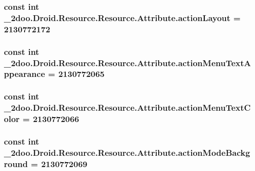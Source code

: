\hypertarget{class__2doo_1_1_droid_1_1_resource_1_1_attribute_d430df0043ea8a6982190472aa047250}{
\subsubsection[{actionLayout}]{\setlength{\rightskip}{0pt plus 5cm}const int \_\-2doo.Droid.Resource.Resource.Attribute.actionLayout = 2130772172}}
\label{class__2doo_1_1_droid_1_1_resource_1_1_attribute_d430df0043ea8a6982190472aa047250}


\hypertarget{class__2doo_1_1_droid_1_1_resource_1_1_attribute_147ad75ca441f29ba2d5044643714d96}{
\subsubsection[{actionMenuTextAppearance}]{\setlength{\rightskip}{0pt plus 5cm}const int \_\-2doo.Droid.Resource.Resource.Attribute.actionMenuTextAppearance = 2130772065}}
\label{class__2doo_1_1_droid_1_1_resource_1_1_attribute_147ad75ca441f29ba2d5044643714d96}


\hypertarget{class__2doo_1_1_droid_1_1_resource_1_1_attribute_d758e2c4517817539ba366ddede1b34f}{
\subsubsection[{actionMenuTextColor}]{\setlength{\rightskip}{0pt plus 5cm}const int \_\-2doo.Droid.Resource.Resource.Attribute.actionMenuTextColor = 2130772066}}
\label{class__2doo_1_1_droid_1_1_resource_1_1_attribute_d758e2c4517817539ba366ddede1b34f}


\hypertarget{class__2doo_1_1_droid_1_1_resource_1_1_attribute_919f672914d063f67e09490b0b981901}{
\subsubsection[{actionModeBackground}]{\setlength{\rightskip}{0pt plus 5cm}const int \_\-2doo.Droid.Resource.Resource.Attribute.actionModeBackground = 2130772069}}
\label{class__2doo_1_1_droid_1_1_resource_1_1_attribute_919f672914d063f67e09490b0b981901}


